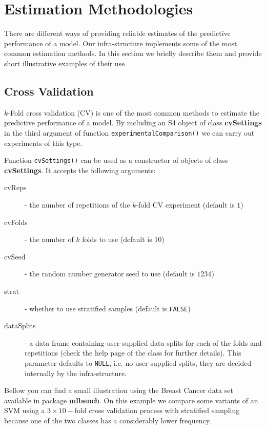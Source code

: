 \documentclass[10pt,a4paper]{article}
\begin{document}
\section{Estimation Methodologies}\label{sec:expMeth}

There are different ways of providing reliable estimates of the
predictive performance of a model. Our infra-structure implements some
of the most common estimation methods. In this section we
briefly describe them and provide short illustrative examples of their
use.

\subsection{Cross Validation}

$k$-Fold cross validation (CV) is one of the most common 
methods to estimate the predictive performance of a model. By
including an S4 object of class \textbf{cvSettings} in the third
argument of function \texttt{experimentalComparison()} we can carry
out experiments of this type.

Function \texttt{cvSettings()} can be used as a constructor of objects
of class \textbf{cvSettings}. It accepts the following arguments:

\begin{description}
\item[cvReps] - the number of repetitions of the $k$-fold CV experiment (default is $1$)
\item[cvFolds] - the number of $k$ folds to use (default is $10$)
\item[cvSeed] - the random number generator seed to use (default is $1234$)
\item[strat] - whether to use stratified samples (default is \texttt{FALSE})
\item[dataSplits] - a data frame containing user-supplied data splits
  for each of the folds and repetitions (check the help page of the
  class for further details). This parameter defaults to
  \texttt{NULL}, i.e. no user-supplied splits, they are decided
  internally by the infra-structure.
\end{description}

Bellow you can find a small illustration using the Breast Cancer data
set available in package \textbf{mlbench}. On this example we compare
some variants of an SVM using a $3\times 10-$fold cross validation
process with stratified sampling because one of the two classes has a
considerably lower frequency.
\end{document}
